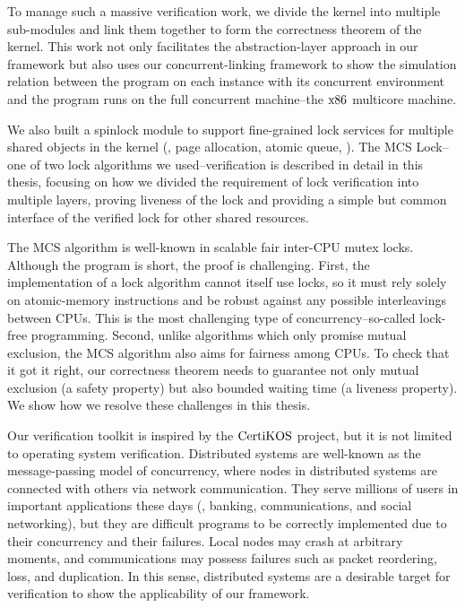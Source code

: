 To manage such a massive verification work, we divide the kernel into multiple sub-modules and link them together to form the 
correctness theorem of the kernel. This work not only facilitates the abstraction-layer approach in our framework 
but also uses our concurrent-linking framework to show the simulation relation between 
the program on each instance with its concurrent environment and the program runs on the full 
concurrent machine--the $\mathrm{x86}$ multicore machine. 

We also built a spinlock module to support fine-grained lock services for multiple shared objects in the kernel 
(\ie, page allocation, atomic queue, \etc).
The MCS Lock--one of two lock algorithms we used--verification is described in detail in this thesis, 
focusing on how we divided the requirement of lock verification into multiple layers, proving
liveness of the lock and providing a simple but common interface of the verified lock for other shared resources.

The MCS algorithm is well-known in scalable fair inter-CPU mutex locks. 
Although the program is short, the proof is challenging. First, the implementation of a lock algorithm cannot itself use locks, 
so it must rely solely on atomic-memory instructions and be robust against any possible interleavings between CPUs. 
This is the most challenging type of concurrency--so-called lock-free programming.
Second, unlike algorithms which only promise mutual exclusion, the MCS algorithm also aims for fairness among CPUs.
To check that it got it right, our correctness theorem needs to guarantee not only mutual exclusion (a safety property) but also bounded waiting time (a liveness property). We show how we resolve these challenges in this thesis.


Our verification toolkit is inspired by the $\mathrm{CertiKOS}$ project, but it is not limited to operating system verification. 
Distributed systems are well-known as the message-passing model of concurrency, where nodes in distributed systems are connected with 
others via network communication. They serve millions of users in important applications
 these days (\ie, banking, communications, and social networking), but they are difficult programs to be correctly implemented 
 due to their concurrency and their failures. Local nodes may crash at arbitrary moments, and communications may possess failures 
 such as packet reordering, loss, and duplication. In this sense, distributed systems are a desirable target for verification to 
 show the applicability of our framework.

